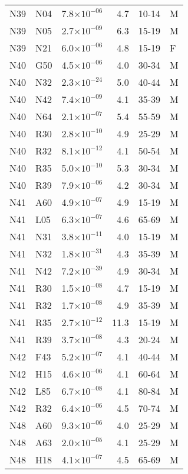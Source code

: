 \begin{longtable}{lllrll}
   N39 & N04 & 7.8$\times10^{-06}$ & 4.7 & 10-14 & M \\ 
   N39 & N05 & 2.7$\times10^{-09}$ & 6.3 & 15-19 & M \\ 
   N39 & N21 & 6.0$\times10^{-06}$ & 4.8 & 15-19 & F \\ 
   N40 & G50 & 4.5$\times10^{-06}$ & 4.0 & 30-34 & M \\ 
   N40 & N32 & 2.3$\times10^{-24}$ & 5.0 & 40-44 & M \\ 
   N40 & N42 & 7.4$\times10^{-09}$ & 4.1 & 35-39 & M \\ 
   N40 & N64 & 2.1$\times10^{-07}$ & 5.4 & 55-59 & M \\ 
   N40 & R30 & 2.8$\times10^{-10}$ & 4.9 & 25-29 & M \\ 
   N40 & R32 & 8.1$\times10^{-12}$ & 4.1 & 50-54 & M \\ 
   N40 & R35 & 5.0$\times10^{-10}$ & 5.3 & 30-34 & M \\ 
   N40 & R39 & 7.9$\times10^{-06}$ & 4.2 & 30-34 & M \\ 
   N41 & A60 & 4.9$\times10^{-07}$ & 4.9 & 15-19 & M \\ 
   N41 & L05 & 6.3$\times10^{-07}$ & 4.6 & 65-69 & M \\ 
   N41 & N31 & 3.8$\times10^{-11}$ & 4.0 & 15-19 & M \\ 
   N41 & N32 & 1.8$\times10^{-31}$ & 4.3 & 35-39 & M \\ 
   N41 & N42 & 7.2$\times10^{-39}$ & 4.9 & 30-34 & M \\ 
   N41 & R30 & 1.5$\times10^{-08}$ & 4.7 & 15-19 & M \\ 
   N41 & R32 & 1.7$\times10^{-08}$ & 4.9 & 35-39 & M \\ 
   N41 & R35 & 2.7$\times10^{-12}$ & 11.3 & 15-19 & M \\ 
   N41 & R39 & 3.7$\times10^{-08}$ & 4.3 & 20-24 & M \\ 
   N42 & F43 & 5.2$\times10^{-07}$ & 4.1 & 40-44 & M \\ 
   N42 & H15 & 4.6$\times10^{-06}$ & 4.1 & 60-64 & M \\ 
   N42 & L85 & 6.7$\times10^{-08}$ & 4.1 & 80-84 & M \\ 
   N42 & R32 & 6.4$\times10^{-06}$ & 4.5 & 70-74 & M \\ 
   N48 & A60 & 9.3$\times10^{-06}$ & 4.0 & 25-29 & M \\ 
   N48 & A63 & 2.0$\times10^{-05}$ & 4.1 & 25-29 & M \\ 
   N48 & H18 & 4.1$\times10^{-07}$ & 4.5 & 65-69 & M \\ 

\end{longtable}
